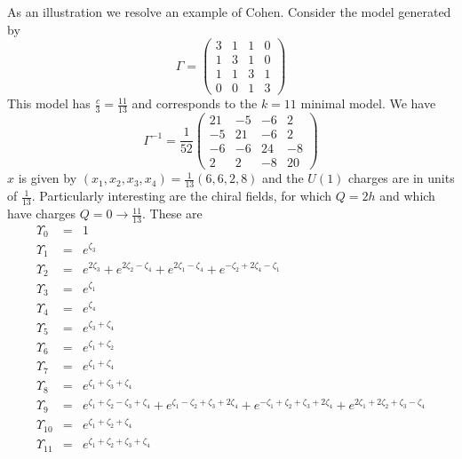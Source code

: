 \documentclass[a4paper,a4paper]{article}
\begin{document}
As an illustration we resolve an example of Cohen.
Consider the model generated by 
\begin{displaymath}
\Gamma = \left( \begin{array}{cccc} 3 & 1 & 1 & 0 \\ 1 & 3 & 1 & 0 \\ 1 & 1 & 3 & 1 \\ 0 & 0 & 1 & 3 \end{array} \right)
\end{displaymath}
This model has $\frac{c}{3} = \frac{11}{13}$ and corresponds to the $k=11$ minimal model. We have
\begin{displaymath}
\Gamma^{-1} = \frac{1}{52} \left( \begin{array}{cccc} 21 & -5 & -6 & 2 \\ -5 & 21 & -6 & 2 \\ -6 & -6 & 24 & -8 \\ 2 & 2 & -8 & 20 \end{array} \right)
\end{displaymath}
$x$ is given by
$(x_1, x_2 , x_3, x_4) = \frac{1}{13}(6, 6, 2, 8)$ and the $U(1)$ charges are in units of $\frac{1}{13}$. Particularly interesting
are the chiral fields, for which $Q=2h$ and which have charges $Q = 0 \to \frac{11}{13}$. These are
\begin{eqnarray}
\Upsilon_0 & = & 1 \nonumber\\
\Upsilon_1 & = & e^{\zeta_3} \nonumber\\
\Upsilon_2 & = & e^{2\zeta_3} + e^{2\zeta_2 - \zeta_4} + e^{2\zeta_1 - \zeta_4} + e^{-\zeta_2 + 2\zeta_4 - \zeta_1} \nonumber \\
\Upsilon_3 & = & e^{\zeta_1} \nonumber\\
\Upsilon_4 & = & e^{\zeta_4} \nonumber\\
\Upsilon_5 & = & e^{\zeta_3 + \zeta_4} \nonumber\\
\Upsilon_6 & = & e^{\zeta_1 + \zeta_2} \nonumber\\
\Upsilon_7 & = & e^{\zeta_1 + \zeta_4} \nonumber\\
\Upsilon_8 & = & e^{\zeta_1 + \zeta_3 + \zeta_4} \nonumber\\
\Upsilon_9 & = & e^{\zeta_1 + \zeta_2 - \zeta_3 + \zeta_4} + e^{\zeta_1 - \zeta_2 + \zeta_3 + 2\zeta_4} + e^{-\zeta_1 + \zeta_2 + \zeta_3 + 2\zeta_4}
             + e^{2\zeta_1 + 2\zeta_2 + \zeta_3 - \zeta_4} \nonumber\\
\Upsilon_{10} & = & e^{\zeta_1 + \zeta_2 + \zeta_4} \nonumber\\
\Upsilon_{11} & = & e^{\zeta_1 + \zeta_2 + \zeta_3 + \zeta_4}\nonumber
\end{eqnarray} 
\end{document}
